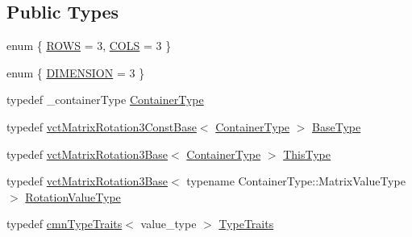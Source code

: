 \subsection*{Public Types}
\begin{DoxyCompactItemize}
\item 
enum \{ \hyperlink{classvct_matrix_rotation3_base_abdf4d3751b8966af4ef69c15998d4115a262124a9ac112fef9aa619bd72e5c5f5}{R\+O\+W\+S} = 3, 
\hyperlink{classvct_matrix_rotation3_base_abdf4d3751b8966af4ef69c15998d4115a55a02c6e4641f16f1c7ca8ba88e47d79}{C\+O\+L\+S} = 3
 \}
\item 
enum \{ \hyperlink{classvct_matrix_rotation3_base_a97514c086bdd3a691714817775b02f21a43f9b5ba9769ee62eadd8398853504cd}{D\+I\+M\+E\+N\+S\+I\+O\+N} = 3
 \}
\item 
typedef \+\_\+container\+Type \hyperlink{classvct_matrix_rotation3_base_ac6181bbfdbc84777f613a0bc5a6bc75a}{Container\+Type}
\item 
typedef \hyperlink{classvct_matrix_rotation3_const_base}{vct\+Matrix\+Rotation3\+Const\+Base}$<$ \hyperlink{classvct_matrix_rotation3_base_ac6181bbfdbc84777f613a0bc5a6bc75a}{Container\+Type} $>$ \hyperlink{classvct_matrix_rotation3_base_a81e215f535ce137435cbafdcb0f3b6f1}{Base\+Type}
\item 
typedef \hyperlink{classvct_matrix_rotation3_base}{vct\+Matrix\+Rotation3\+Base}$<$ \hyperlink{classvct_matrix_rotation3_base_ac6181bbfdbc84777f613a0bc5a6bc75a}{Container\+Type} $>$ \hyperlink{classvct_matrix_rotation3_base_a027be766cb10ca3c2ad8e85c28ed0af9}{This\+Type}
\item 
typedef \hyperlink{classvct_matrix_rotation3_base}{vct\+Matrix\+Rotation3\+Base}$<$ typename Container\+Type\+::\+Matrix\+Value\+Type $>$ \hyperlink{classvct_matrix_rotation3_base_a9cac9a0141e6b59fe9185b1121f70229}{Rotation\+Value\+Type}
\item 
typedef \hyperlink{classcmn_type_traits}{cmn\+Type\+Traits}$<$ value\+\_\+type $>$ \hyperlink{classvct_matrix_rotation3_base_aa759c028d73ab710d2e116ca08252719}{Type\+Traits}
\end{DoxyCompactItemize}
